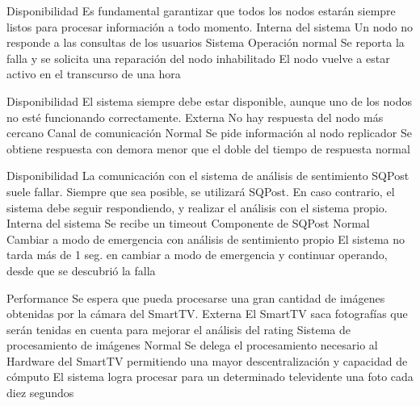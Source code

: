   \begin{enumerate}


\QA
  {Disponibilidad} %
  {Es fundamental garantizar que todos los nodos estarán siempre listos para procesar información a todo momento.} %
  {Interna del sistema} %
  {Un nodo no responde a las consultas de los usuarios} %
  {Sistema} %
  {Operación normal} %
  {Se reporta la falla y se solicita una reparación del nodo inhabilitado} %
  {El nodo vuelve a estar activo en el transcurso de una hora} %

\QA
  {Disponibilidad} %
  {El sistema siempre debe estar disponible, aunque uno de los nodos no esté funcionando correctamente.} %
  {Externa} %
  {No hay respuesta del nodo más cercano} %
  {Canal de comunicación} %
  {Normal} %
  {Se pide información al nodo replicador} %
  {Se obtiene respuesta con demora menor que el doble del tiempo de respuesta normal} %

\QA
  {Disponibilidad} %
  {La comunicación con el sistema de análisis de sentimiento SQPost suele fallar. Siempre que sea posible, se utilizará SQPost. En caso contrario, el sistema debe seguir respondiendo, y realizar el análisis con el sistema propio.} %
  {Interna del sistema} %
  {Se recibe un timeout} %
  {Componente de SQPost} %
  {Normal} %
  {Cambiar a modo de emergencia con análisis de sentimiento propio} %
  {El sistema no tarda más de 1 seg. en cambiar a modo de emergencia y continuar operando, desde que se descubrió la falla} %



\QA
  {Performance} %
  {Se espera que pueda procesarse una gran cantidad de imágenes obtenidas por la cámara del SmartTV.} %
  {Externa} %
  {El SmartTV saca fotografías que serán tenidas en cuenta para mejorar el análisis del rating} %
  {Sistema de procesamiento de imágenes} %
  {Normal} %
  {Se delega el procesamiento necesario al Hardware del SmartTV permitiendo una mayor descentralización y capacidad de cómputo} %
  {El sistema logra procesar para un determinado televidente una foto cada diez segundos} %


\end{enumerate}
